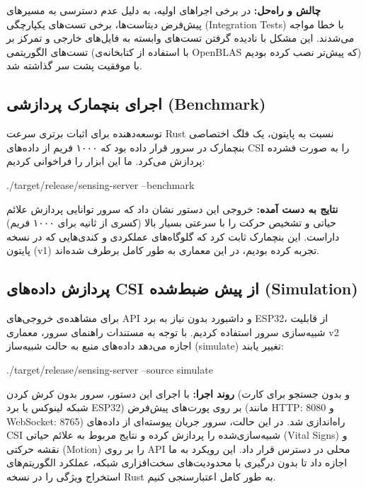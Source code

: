 \documentclass[12pt, a4paper]{article}
\newcommand{\lr}[1]{\foreignlanguage{english}{#1}}
\begin{document}
\textbf{چالش و راه‌حل:} در برخی اجراهای اولیه، به دلیل عدم دسترسی به مسیرهای پیش‌فرض دیتاست‌ها، برخی تست‌های یکپارچگی (\lr{Integration Tests}) با خطا مواجه می‌شدند. این مشکل با نادیده گرفتن تست‌های وابسته به فایل‌های خارجی و تمرکز بر تست‌های الگوریتمی (با استفاده از کتابخانه‌ی \lr{OpenBLAS} که پیش‌تر نصب کرده بودیم) با موفقیت پشت سر گذاشته شد.

\subsection{اجرای بنچمارک پردازشی (\lr{Benchmark})}
توسعه‌دهنده برای اثبات برتری سرعت \lr{Rust} نسبت به پایتون، یک فلگ اختصاصی بنچمارک در سرور قرار داده بود که ۱۰۰۰ فریم از داده‌های \lr{CSI} را به صورت فشرده پردازش می‌کرد. ما این ابزار را فراخوانی کردیم:

\begin{otherlanguage}{english}
\begin{terminalbox}
./target/release/sensing-server --benchmark
\end{terminalbox}
\end{otherlanguage}

\textbf{نتایج به دست آمده:} خروجی این دستور نشان داد که سرور توانایی پردازش علائم حیاتی و تشخیص حرکت را با سرعتی بسیار بالا (کسری از ثانیه برای ۱۰۰۰ فریم) داراست. این بنچمارک ثابت کرد که گلوگاه‌های عملکردی و کندی‌هایی که در نسخه پایتون (\lr{v1}) تجربه کرده بودیم، در این معماری به طور کامل برطرف شده‌اند.

\subsection{پردازش داده‌های \lr{CSI} از پیش ضبط‌شده (\lr{Simulation})}
برای مشاهده‌ی خروجی‌های \lr{API} و داشبورد بدون نیاز به برد \lr{ESP32}، از قابلیت شبیه‌سازی سرور استفاده کردیم. با توجه به مستندات راهنمای سرور، معماری \lr{v2} اجازه می‌دهد داده‌های منبع به حالت شبیه‌ساز (\lr{simulate}) تغییر یابند:

\begin{otherlanguage}{english}
\begin{terminalbox}
./target/release/sensing-server --source simulate
\end{terminalbox}
\end{otherlanguage}

\textbf{روند اجرا:} 
با اجرای این دستور، سرور بدون کرش کردن (و بدون جستجو برای کارت شبکه لینوکس یا برد \lr{ESP32}) بر روی پورت‌های پیش‌فرض (مانند \lr{HTTP: 8080} و \lr{WebSocket: 8765}) راه‌اندازی شد. در این حالت، سرور جریان پیوسته‌ای از داده‌های \lr{CSI} شبیه‌سازی‌‌شده را پردازش کرده و نتایج مربوط به علائم حیاتی (\lr{Vital Signs}) و نقشه حرکتی (\lr{Motion}) را بر روی \lr{API} محلی در دسترس قرار داد. این رویکرد به ما اجازه داد تا بدون درگیری با محدودیت‌های سخت‌افزاری شبکه، عملکرد الگوریتم‌های استخراج ویژگی را در نسخه \lr{Rust} به طور کامل اعتبارسنجی کنیم.
\end{document}
